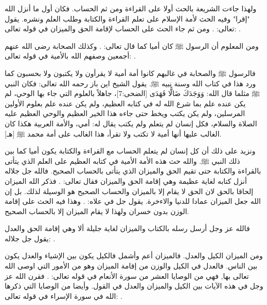 ولهذا جاءت الشريعة بالحث أولا على القراءة ومن ثم الحساب. فكان أول ما أنزل الله "إقرا" وفيه الحث لأمة الإسلام على تعلم القراءة والكتابة وطلب العلم ونشره.
يقول تعالى:
\quranayah*[96][1-5]{\footnotesize \surahname*[96]}.
ومن ثم جاء الحث على الحساب لإقامة الحق والميزان في قوله تعالى:
\quranayah*[10][5]{\footnotesize \surahname*[10]}.

ومن المعلوم أن الرسول ﷺ كان أميا كما قال تعالى:
\quranayah*[7][158]{\footnotesize \surahname*[7]}.
وكذلك الصحابة رضى الله عنهم أجمعين وصفهم الله بالأمية في قوله تعالى:
\quranayah*[62][2]{\footnotesize \surahname*[62]}.

فالرسول ﷺ والصحابة في غالبهم كانوا أمة أمية لا يقرأون ولا يكتبون ولا بحسبون كما ورد هذا في كتاب الله وسنة نبيه ﷺ.
يقول الشيخ اين باز رحمه الله تعالى:
فكان النبي ﷺ مثلما قال الله: وَوَجَدَكَ ضَالًّا فَهَدَى [الضحى:7]، جاهلاً بالعلوم التي جاء بها الوحي، لم يكن عنده علم بما شرع الله له في كتابه العظيم، ولم يكن عنده علم بعلوم الأولين المرسلين، ولم يكن يكتب ويخط حتى جاءه هذا الخير العظيم والوحي العظيم عليه الصلاة والسلام، فكل إنسان لم يتعلم ولم يكتب يقال له: أمي، والأمة العربية هكذا كان الغالب عليها أنها أمية لا تكتب ولا تقرأ، هذا الغالب على أمة محمد ﷺ
[هـ].

ونزيد على ذلك أن كل إنسان لم يتعلم الحساب مع القراءة والكتابة يكون أميا كما بين ذلك النبي ﷺ. والله حث هذه الأمة الأمية في كتابه العظيم على العلم الذي يتأتى بالقراءة والكتابة حتى تقيم الحق والميزان الذي يتأتى بالحساب الصحيح. فالله جل جلاله أنزل كتابه لغاية عظيمة وهي إقامة الحق والميزان فقال تعالى:
\quranayah*[42][17]{\footnotesize \surahname*[42]}.
فذكر الله الميزان إلحاقا بالحق لان الحق لا يقام إلا بالميزان والحساب الصحيح هو الوسيلة لذلك. بل إن الله جعل الميزان  عمادا للدنيا والاءخرة. يقول جل في علاه:
\quranayah*[55][7-9]{\footnotesize \surahname*[55]}. وهذا فيه الحث على إقامة الوزن بدون خسران ولهذا لا يقام الميزان إلا بالحساب الصحيح.

فالله عز وجل أرسل رسله بالكتاب والميزان لغاية جليلة ألا وهي إقامة الحق والعدل يقول جل جلاله:
\quranayah*[57][25]{\footnotesize \surahname*[57]}.

ومن الميزان الكيل والعدل. فالميزان أعم وأشمل فالكيل يكون بين الإشياء والعدل يكون بين الناس. فالعدل في الكيل والوزن من إقامة الميزان وهو من الأمور التي اوصى الله تعالى بها, فهي من الوصايا العشر من سورة الأنعام في قوله تعالى:
\quranayah*[6][152][12]{\footnotesize \surahname*[6]}. فقرن الله عز وجل في هذه الآيات بين الكيل والميزان والعدل في القول.
وأيضا من الوصايا التي ذكرها الله في سورة الإسراء في قوله تعالى:
\quranayah*[17][35]{\footnotesize \surahname*[17]}.

